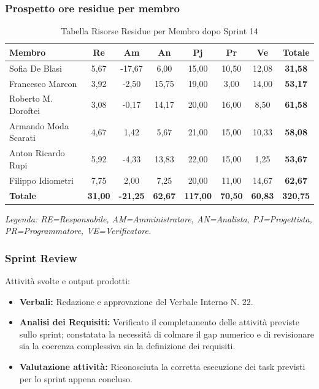 \subsubsection{Prospetto ore residue per membro}
\begin{table}[H]
    \centering
    \renewcommand{\arraystretch}{1.3}
    \begin{tabularx}{\textwidth}{|X|c|c|c|c|c|c|c|}
        \hline
        \textbf{Membro} & \textbf{Re} & \textbf{Am} & \textbf{An} &
        \textbf{Pj} & \textbf{Pr} & \textbf{Ve} & \textbf{Totale} \\
        \hline
        Sofia De Blasi       &  5,67 & -17,67 &  6,00 & 15,00 & 10,50 & 12,08 & \textbf{31,58} \\
        Francesco Marcon     &  3,92 &  -2,50 & 15,75 & 19,00 &  3,00 & 14,00 & \textbf{53,17} \\
        Roberto M. Doroftei  &  3,08 &  -0,17 & 14,17 & 20,00 & 16,00 &  8,50 & \textbf{61,58} \\
        Armando Moda Scarati &  4,67 &   1,42 &  5,67 & 21,00 & 15,00 & 10,33 & \textbf{58,08} \\
        Anton Ricardo Rupi   &  5,92 &  -4,33 & 13,83 & 22,00 & 15,00 &  1,25 & \textbf{53,67} \\
        Filippo Idiometri    &  7,75 &   2,00 &  7,25 & 20,00 & 11,00 & 14,67 & \textbf{62,67} \\
        \hline
        \textbf{Totale} &
        \textbf{31,00} & \textbf{-21,25} & \textbf{62,67} &
        \textbf{117,00} & \textbf{70,50} & \textbf{60,83} &
        \textbf{320,75} \\
        \hline
    \end{tabularx}
    \begin{minipage}{\textwidth}
        \smallskip
        \footnotesize\textit{Legenda: RE=Responsabile, AM=Amministratore,
        AN=Analista, PJ=Progettista, PR=Programmatore, VE=Verificatore.}
    \end{minipage}
    \caption{Tabella Risorse Residue per Membro dopo Sprint 14}
\end{table}

\subsubsection{Sprint Review}
Attività svolte e output prodotti:
\begin{itemize}
    \item \textbf{Verbali:} Redazione e approvazione del Verbale Interno N. 22.
    \item \textbf{Analisi dei Requisiti:} Verificato il completamento delle attività previste sullo sprint; constatata la necessità di colmare il gap numerico e di revisionare sia la coerenza complessiva sia la definizione dei requisiti.
    \item \textbf{Valutazione attività:} Riconosciuta la corretta esecuzione dei task previsti per lo sprint appena concluso.
\end{itemize}

